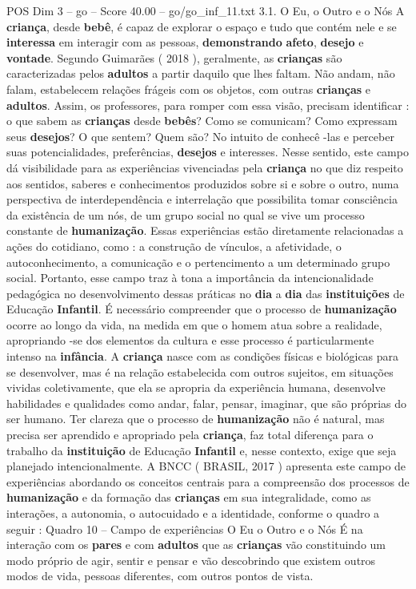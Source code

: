\begin{textsample}{POS Dim 3 – go – Score 40.00 – go/go\_inf\_11.txt}  \label{ex:f3_pos_044}
3.1.
O Eu, o Outro e o Nós A \textbf{criança}, desde \textbf{bebê}, é capaz de explorar o espaço e tudo que contém nele e se \textbf{interessa} em interagir com as pessoas, \textbf{demonstrando} \textbf{afeto}, \textbf{desejo} e \textbf{vontade}.
Segundo Guimarães ( 2018 ), geralmente, as \textbf{crianças} são caracterizadas pelos \textbf{adultos} a partir daquilo que lhes faltam.
Não andam, não falam, estabelecem relações frágeis com os objetos, com outras \textbf{crianças} e \textbf{adultos}.
Assim, os professores, para romper com essa visão, precisam identificar : o que sabem as \textbf{crianças} desde \textbf{bebês}?
Como se comunicam?
Como expressam seus \textbf{desejos}?
O que sentem?
Quem são?
No intuito de conhecê -las e perceber suas potencialidades, preferências, \textbf{desejos} e interesses.
Nesse sentido, este campo dá visibilidade para as experiências vivenciadas pela \textbf{criança} no que diz respeito aos sentidos, saberes e conhecimentos produzidos sobre si e sobre o outro, numa perspectiva de interdependência e interrelação que possibilita tomar consciência da existência de um nós, de um grupo social no qual se vive um processo constante de \textbf{humanização}.
Essas experiências estão diretamente relacionadas a ações do cotidiano, como : a construção de vínculos, a afetividade, o autoconhecimento, a comunicação e o pertencimento a um determinado grupo social.
Portanto, esse campo traz à tona a importância da intencionalidade pedagógica no desenvolvimento dessas práticas no \textbf{dia} a \textbf{dia} das \textbf{instituições} de Educação \textbf{Infantil}.
É necessário compreender que o processo de \textbf{humanização} ocorre ao longo da vida, na medida em que o homem atua sobre a realidade, apropriando -se dos elementos da cultura e esse processo é particularmente intenso na \textbf{infância}.
A \textbf{criança} nasce com as condições físicas e biológicas para se desenvolver, mas é na relação estabelecida com outros sujeitos, em situações vividas coletivamente, que ela se apropria da experiência humana, desenvolve habilidades e qualidades como andar, falar, pensar, imaginar, que são próprias do ser humano.
Ter clareza que o processo de \textbf{humanização} não é natural, mas precisa ser aprendido e apropriado pela \textbf{criança}, faz total diferença para o trabalho da \textbf{instituição} de Educação \textbf{Infantil} e, nesse contexto, exige que seja planejado intencionalmente.
A BNCC ( BRASIL, 2017 ) apresenta este campo de experiências abordando os conceitos centrais para a compreensão dos processos de \textbf{humanização} e da formação das \textbf{crianças} em sua integralidade, como as interações, a autonomia, o autocuidado e a identidade, conforme o quadro a seguir : Quadro 10 – Campo de experiências O Eu o Outro e o Nós É na interação com os \textbf{pares} e com \textbf{adultos} que as \textbf{crianças} vão constituindo um modo próprio de agir, sentir e pensar e vão descobrindo que existem outros modos de vida, pessoas diferentes, com outros pontos de vista.

\end{textsample}
